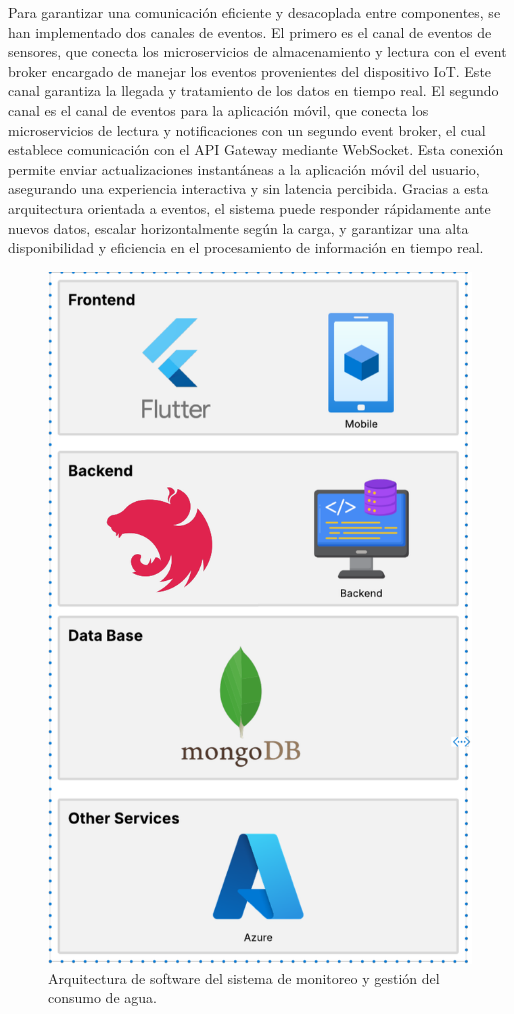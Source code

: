 \documentclass[conference]{IEEEtran}
\begin{document}
Para garantizar una comunicación eficiente y desacoplada entre componentes, se han implementado dos canales de eventos. El primero es el canal de eventos de sensores, que conecta los microservicios de almacenamiento y lectura con el event broker encargado de manejar los eventos provenientes del dispositivo IoT. Este canal garantiza la llegada y tratamiento de los datos en tiempo real. El segundo canal es el canal de eventos para la aplicación móvil, que conecta los microservicios de lectura y notificaciones con un segundo event broker, el cual establece comunicación con el API Gateway mediante WebSocket. Esta conexión permite enviar actualizaciones instantáneas a la aplicación móvil del usuario, asegurando una experiencia interactiva y sin latencia percibida. Gracias a esta arquitectura orientada a eventos, el sistema puede responder rápidamente ante nuevos datos, escalar horizontalmente según la carga, y garantizar una alta disponibilidad y eficiencia en el procesamiento de información en tiempo real.

\begin{figure}[!htbp]
\centerline{\includegraphics[width=\linewidth,height=1\textheight,keepaspectratio]{Arquitectura_fisica_ff.png}}
\caption{Arquitectura de software del sistema de monitoreo y gestión del consumo de agua.}
\label{fig}
\end{figure}
\end{document}
